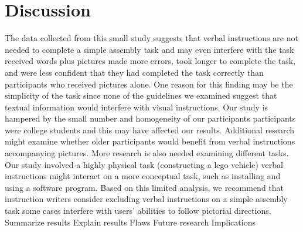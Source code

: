 \documentclass{article}
\begin{document}
\section{Discussion}
The data collected from this small study suggests that verbal instructions are not needed to 
complete a simple assembly task and may even interfere with the task
received words plus pictures made more errors, took longer to complete the task, and were less 
confident	that	they	had	completed	the	task	correctly	than	participants	who	received	pictures	
alone.	One	reason	for	this	finding	may	be	the	simplicity	of	the	task	since	none	of	the	guidelines	
we examined suggest that textual information would interfere with visual instructions.
Our study is hampered by the small number and homogeneity of our participants
participants	were	college	students	and	this	may	have	affected	our	results.	Additional	research	
might	examine	whether	older	participants	would	benefit	from	verbal	instructions	accompanying	
pictures.		More	research	is	also	needed	examining	different	tasks.	Our	study	involved	a	highly	
physical task (constructing a lego vehicle)
verbal instructions might interact on a more conceptual task, such as installing and using a 
software program.
Based on this limited analysis, we recommend that instruction writers consider excluding verbal 
instructions on a simple assembly task
some cases interfere with users’ abilities to follow pictorial directions.
Summarize results
Explain results
Flaws
Future research
Implications
\lipsum[4] %
\end{document}
